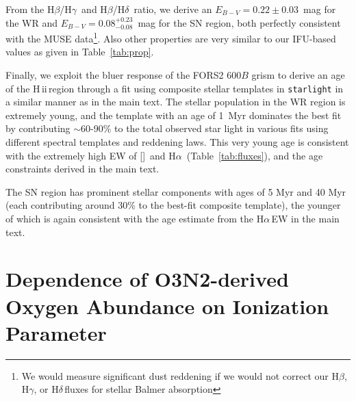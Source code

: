 \documentclass[traditabstract]{aa}
\newcommand{\hb}{H$\beta$}
\newcommand{\ha}{H$\alpha$}
\newcommand{\hg}{H$\gamma$}
\newcommand{\hd}{H$\delta$}
\newcommand{\hii}{\mbox{H\,{\sc ii}}}
\newcommand{\oiii}{[\ion{O}{iii}]}
\begin{document}
\begin{appendix}
From the \hb/\hg\, and \hb/\hd\, ratio, we derive an $E_{B-V}=0.22\pm0.03$~mag for the WR and $E_{B-V}=0.08_{-0.08}^{+0.23}$~mag for the SN region, both perfectly consistent with the MUSE data\footnote{We would measure significant dust reddening if we would not correct our \hb, \hg, or \hd\,fluxes for stellar Balmer absorption}. Also other properties are very similar to our IFU-based values as given in Table~\ref{tab:prop}.

Finally, we exploit the bluer response of the FORS2 600$B$ grism to derive an age of the \hii\,region through a fit using composite stellar templates in \texttt{starlight} in a similar manner as in the main text. The stellar population in the WR region is extremely young, and the \citet{2003MNRAS.344.1000B} template with an age of 1~Myr dominates the best fit by contributing $\sim$60-90\% to the total observed star light in various fits using different spectral templates and reddening laws. This very young age is consistent with the extremely high EW of \oiii\, and \ha\, (Table~\ref{tab:fluxes}), and the age constraints derived in the main text.

The SN region has prominent stellar components with ages of 5 Myr and 40 Myr (each contributing around 30\% to the best-fit composite template), the younger of which is again consistent with the age estimate from the \ha\,EW in the main text.

\section{Dependence of O3N2-derived Oxygen Abundance on Ionization Parameter}
\label{sec:abundancevsion}


\end{appendix}
\end{document}
